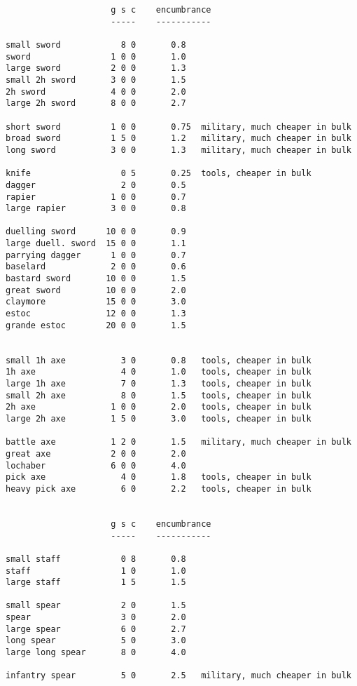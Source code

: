\small
\begin{verbatim}
                     g s c    encumbrance
                     -----    -----------

small sword            8 0       0.8
sword                1 0 0       1.0
large sword          2 0 0       1.3
small 2h sword       3 0 0       1.5
2h sword             4 0 0       2.0
large 2h sword       8 0 0       2.7

short sword          1 0 0       0.75  military, much cheaper in bulk
broad sword          1 5 0       1.2   military, much cheaper in bulk
long sword           3 0 0       1.3   military, much cheaper in bulk

knife                  0 5       0.25  tools, cheaper in bulk
dagger                 2 0       0.5
rapier               1 0 0       0.7
large rapier         3 0 0       0.8

duelling sword      10 0 0       0.9
large duell. sword  15 0 0       1.1
parrying dagger      1 0 0       0.7
baselard             2 0 0       0.6
bastard sword       10 0 0       1.5
great sword         10 0 0       2.0
claymore            15 0 0       3.0
estoc               12 0 0       1.3
grande estoc        20 0 0       1.5


small 1h axe           3 0       0.8   tools, cheaper in bulk
1h axe                 4 0       1.0   tools, cheaper in bulk
large 1h axe           7 0       1.3   tools, cheaper in bulk
small 2h axe           8 0       1.5   tools, cheaper in bulk
2h axe               1 0 0       2.0   tools, cheaper in bulk
large 2h axe         1 5 0       3.0   tools, cheaper in bulk

battle axe           1 2 0       1.5   military, much cheaper in bulk
great axe            2 0 0       2.0
lochaber             6 0 0       4.0
pick axe               4 0       1.8   tools, cheaper in bulk
heavy pick axe         6 0       2.2   tools, cheaper in bulk


                     g s c    encumbrance
                     -----    -----------

small staff            0 8       0.8
staff                  1 0       1.0
large staff            1 5       1.5

small spear            2 0       1.5
spear                  3 0       2.0
large spear            6 0       2.7
long spear             5 0       3.0
large long spear       8 0       4.0

infantry spear         5 0       2.5   military, much cheaper in bulk


\end{verbatim}
